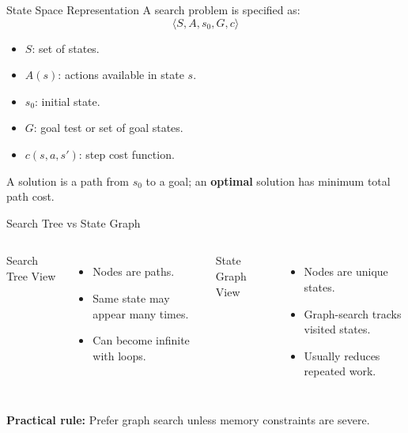 \documentclass[10pt]{beamer}
\begin{document}
\begin{frame}{State Space Representation}
    A search problem is specified as:
    \[
        \langle S, A, s_0, G, c \rangle
    \]
    \begin{itemize}
        \item $S$: set of states.
        \item $A(s)$: actions available in state $s$.
        \item $s_0$: initial state.
        \item $G$: goal test or set of goal states.
        \item $c(s,a,s')$: step cost function.
    \end{itemize}
    \vspace{0.2cm}
    A solution is a path from $s_0$ to a goal; an \textbf{optimal} solution has minimum total path cost.
\end{frame}

\begin{frame}{Search Tree vs State Graph}
    \begin{columns}[T,onlytextwidth]
            \alert{Search Tree View}
            \begin{itemize}
                \item Nodes are paths.
                \item Same state may appear many times.
                \item Can become infinite with loops.
            \end{itemize}
            \alert{State Graph View}
            \begin{itemize}
                \item Nodes are unique states.
                \item Graph-search tracks visited states.
                \item Usually reduces repeated work.
            \end{itemize}
    \end{columns}
    \vspace{0.3cm}
    \textbf{Practical rule:} Prefer graph search unless memory constraints are severe.
\end{frame}
\end{document}
